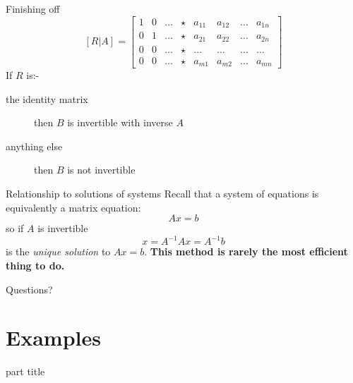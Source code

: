 \documentclass{beamer}
\begin{document}
\begin{frame}{Finishing off}
  \begin{equation*}
    \left[R|A\right]=
    \left[
      \begin{array}{cccc|cccc}
        1 & 0 & \dots & \star & a_{11} & a_{12} &\dots & a_{1n}\\
        0 & 1 & \dots & \star & a_{21} & a_{22} &\dots & a_{2n}\\
        0 & 0 & \dots & \star & \dots & \dots &\dots & \dots\\
        0 & 0 & \dots & \star & a_{m1} & a_{m2} &\dots & a_{mn}
      \end{array}
    \right]
  \end{equation*}\vfill
  If $R$ is:-\vfill
  \begin{description}
  \item [the identity matrix] then $B$ is invertible with inverse $A$\vfill
  \item [anything else] then $B$ is not invertible
  \end{description}
\end{frame}

\begin{frame}{Relationship to solutions of systems}
  Recall that a system of equations is equivalently a matrix equation:
  \begin{equation*}
    Ax=b
  \end{equation*}
  so if $A$ is invertible
  \begin{equation*}
    x = A^{-1}Ax = A^{-1}b
  \end{equation*}
  is the \emph{unique solution} to $Ax=b$.\vfill
  \bf{This method is rarely the most efficient thing to do.}
\end{frame}

\begin{frame}
  Questions?
\end{frame}

\section{Examples}

\begin{frame}
  \begin{beamercolorbox}[sep=12pt,center]{part title}
    \insertsection\par
  \end{beamercolorbox}
\end{frame}
\end{document}
